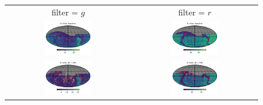 \documentclass[preprintm,linenumbers]{aastex631}
\begin{document}
\begin{figure}
   		\centering
			\begin{tabular}{c c}
          filter = $g$ &  filter = $r$\\
   		\includegraphics[width=0.4\textwidth]{results/skymaps_cutout/skymaps_cutout_first_year_one_snap_v4_0_10yrs_db_noDD_noTwi_nside-256_CountMetric_g_noDD_noTwi.pdf} &
   		\includegraphics[width=0.4\textwidth]{results/skymaps_cutout/skymaps_cutout_first_year_one_snap_v4_0_10yrs_db_noDD_noTwi_nside-256_CountMetric_r_noDD_noTwi.pdf} \\

         \includegraphics[width=0.4\textwidth]{results/skymaps_cutout/skymaps_cutout_first_year_one_snap_v4_0_10yrs_db_noDD_noTwi_tscale-14_nside-256_doAllTemplateMetrics_reduceCount_g_noDD_noTwi.pdf} &
         \includegraphics[width=0.4\textwidth]{results/skymaps_cutout/skymaps_cutout_first_year_one_snap_v4_0_10yrs_db_noDD_noTwi_tscale-14_nside-256_doAllTemplateMetrics_reduceCount_r_noDD_noTwi.pdf} \\


\end{tabular}
\end{figure}
\end{document}
